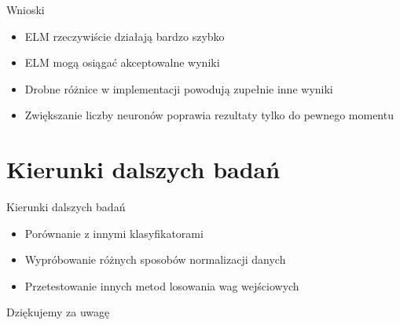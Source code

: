 \documentclass{beamer}
\begin{document}
\begin{frame}{Wnioski}
\begin{itemize}
\item ELM rzeczywiście działają bardzo szybko
\item ELM mogą osiągać akceptowalne wyniki
\item Drobne różnice w implementacji powodują zupełnie inne wyniki
\item Zwiększanie liczby neuronów poprawia rezultaty tylko do pewnego momentu
\end{itemize}
\end{frame}

\section{Kierunki dalszych badań}
\begin{frame}{Kierunki dalszych badań}
\begin{itemize}
\item Porównanie z innymi klasyfikatorami
\item Wypróbowanie różnych sposobów normalizacji danych
\item Przetestowanie innych metod losowania wag wejściowych
\end{itemize}
\end{frame}

\begin{frame}
\begin{center}
\huge{Dziękujemy za uwagę}
\end{center}
\end{frame}
\end{document}
